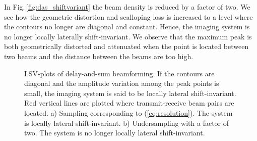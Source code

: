 \documentclass[journal]{IEEEtran}
\newcommand{\img}{img/}
\begin{document}

In Fig.\,\ref{fig:das_shiftvariant} the beam density is reduced by a factor of two. We see how the geometric distortion and scalloping loss is increased to a level where the contours no longer are diagonal and constant. Hence, the imaging system is no longer locally laterally shift-invariant. We observe that the maximum peak is both geometrically distorted and attenuated when the point is located between two beams and the distance between the beams are too high.

\begin{figure}[!t]
\centerline{
\hfill{}
}
\caption{LSV-plots of delay-and-sum beamforming. If the contours are diagonal and the amplitude variation among the peak points is small, the imaging system is said to be locally lateral shift-invariant. Red vertical lines are plotted where transmit-receive beam pairs are located. a) Sampling corresponding to (\ref{eq:resolution}). The system is locally lateral shift-invariant. b) Undersampling with a factor of two. The system is no longer locally lateral shift-invariant.}
\label{fig:das}
\end{figure}
\end{document}
